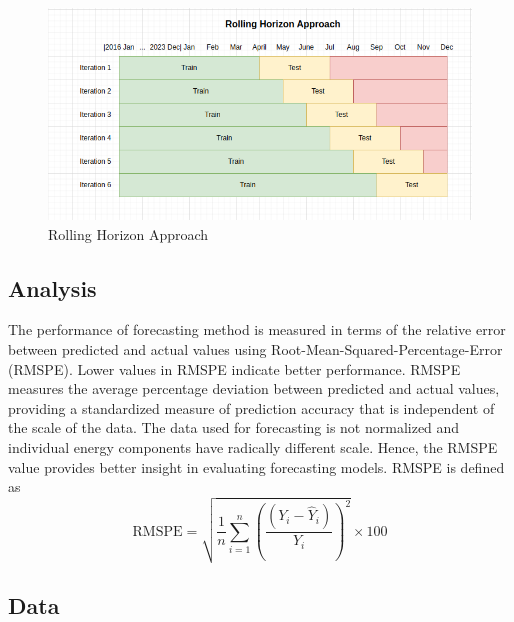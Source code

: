 \documentclass[]{usiinfbachelorproject}
\begin{document}
\begin{figure}[htp!]
    \centering
    \includegraphics[width=0.5\linewidth]{figures/rha.png}
    \caption{Rolling Horizon Approach}
    \label{fig:rha} %
\end{figure}

\subsection{ Analysis}

The performance of forecasting method is measured in terms of the relative error between predicted and actual values using Root-Mean-Squared-Percentage-Error (RMSPE)\cite{botchkarev_performance_2019}. Lower values in RMSPE indicate better performance. RMSPE measures the average percentage deviation between predicted and actual values, providing a standardized measure of prediction accuracy that is independent of the scale of the data. The data used for forecasting is not normalized and individual energy components have radically different scale. Hence, the RMSPE value provides better insight in evaluating forecasting models. RMSPE is defined as \\

\begin{equation}
\text{RMSPE} = \sqrt{\frac{1}{n} \sum_{i=1}^{n} \left( \frac{(Y_i - \hat{Y}_i)}{Y_i} \right)^2} \times 100
\end{equation}

\subsection{Data}
\end{document}
